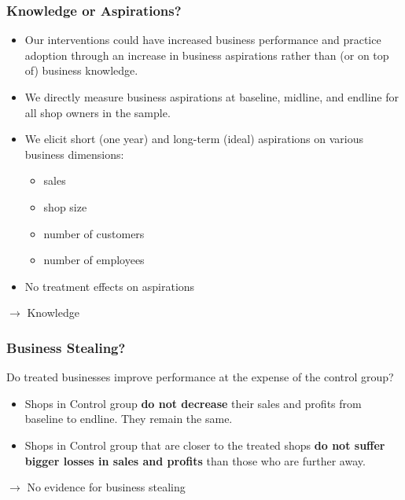 \documentclass[hideothersubsections, usenames,dvipsnames,10pt]{beamer}
\begin{document}
\begin{frame}
\frametitle{Knowledge or Aspirations?}
\begin{itemize}
\item Our interventions could have increased business performance and practice adoption through an increase in business aspirations rather than (or on top of) business knowledge.
\vspace{0.2in}
\item We directly measure business aspirations at baseline, midline, and endline for all shop owners in the sample.
\vspace{0.2in}
\item We elicit short (one year) and long-term (ideal) aspirations on various business dimensions:
\vspace{0.1in}
    \begin{itemize}
    \item sales
    \item shop size
    \item number of customers
    \item number of employees
    \end{itemize}
\vspace{0.2in}
\item No treatment effects on aspirations
\vspace{0.2in}
\end{itemize}
$\rightarrow$ \textcolor[rgb]{0.00,0.07,1.00}{Knowledge}
\end{frame}

\begin{frame}
\frametitle{Business Stealing?}
Do treated businesses improve performance at the expense of the control group?
\vspace{0.1in}
\begin{itemize}
\item Shops in Control group \textbf{do not decrease} their sales and profits from baseline to endline. They remain the same.
\vspace{0.1in}
\item Shops in Control group that are closer to the treated shops \textbf{do not suffer bigger losses in sales and profits} than those who are further away.
\end{itemize}
\vspace{0.2in}
$\rightarrow$ \textcolor[rgb]{0.00,0.07,1.00}{No evidence for business stealing}
\end{frame}
\end{document}

